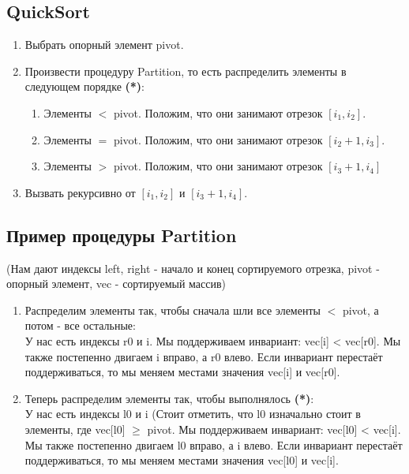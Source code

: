 \subsection*{QuickSort}

\Alg 
\begin{enumerate}
    \item Выбрать опорный элемент pivot.
    \item Произвести процедуру Partition, то есть распределить элементы в следующем порядке \textbf{(*)}:
    \begin{enumerate}
        \item Элементы $<$ pivot. Положим, что они занимают отрезок $[i_1, i_2].$
        \item Элементы $=$ pivot. Положим, что они занимают отрезок $[i_2 + 1, i_3].$
        \item Элементы $>$ pivot. Положим, что они занимают отрезок $[i_3 + 1, i_4]$
    \end{enumerate}
    \item Вызвать рекурсивно от $[i_1, i_2]$ и $[i_3 + 1, i_4]$.
\end{enumerate}

\subsection*{Пример процедуры Partition}

(Нам дают индексы left, right - начало и конец сортируемого отрезка, pivot - опорный элемент, vec - сортируемый массив) 

\begin{enumerate}
    \item Распределим элементы так, чтобы сначала шли все элементы $<$ pivot, а потом - все остальные:\\
    
    У нас есть индексы r0 и i. Мы поддерживаем инвариант: vec[i] < vec[r0]. Мы также постепенно двигаем i вправо, а r0 влево. Если инвариант перестаёт поддерживаться, то мы меняем местами значения vec[i] и vec[r0].
    \item Теперь распределим элементы так, чтобы выполнялось \textbf{(*)}:\\

    У нас есть индексы l0 и i (Стоит отметить, что l0 изначально стоит в элементы, где vec[l0] $\geq$ pivot. Мы поддерживаем инвариант: vec[l0] < vec[i]. Мы также постепенно двигаем l0 вправо, а i влево. Если инвариант перестаёт поддерживаться, то мы меняем местами значения vec[l0] и vec[i].
\end{enumerate}

